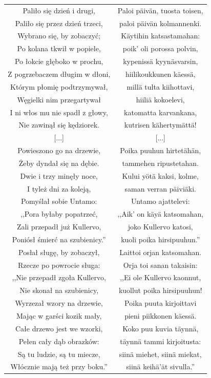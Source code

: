 \documentclass[11pt,a4paper,twoside]{report}
\begin{document}
{\begin{longtable}{c c}
Paliło się dzień i drugi, & Paloi päivän, tuosta toisen, \\
Paliło się przez dzień trzeci, & paloi päivän kolmannenki. \\
Wybrano się, by zobaczyć; & Käytihin katsastamahan: \\
Po kolana tkwił w popiele, & poik' oli porossa polvin, \\
Po łokcie głęboko w prochu, & kypenissä kyynäsvarsin, \\
Z pogrzebaczem długim w dłoni, & hiilikoukkunen käessä, \\
Którym płomię podtrzymywał, & millä tulta kiihottavi, \\
Węgielki nim przegartywał & hiiliä kokoelevi, \\
I ni włos mu nie spadł z głowy, & katomatta karvankana, \\
Nie zawinął się kędziorek. & kutrisen kähertymättä! \\
{[...]} & {[...]} \\
Powieszono go na drzewie, & Poika puuhun hirtetähän, \\
Żeby dyndał się na dębie. & tammehen ripustetahan. \\
Dwie i trzy minęły noce, & Kului yötä kaksi, kolme, \\
I tyleż dni za koleją, & saman verran päiviäki. \\
Pomyślał sobie Untamo: & Untamo ajattelevi: \\
,,Pora byłaby popatrzeć, & ,,Aik' on käyä katsomahan, \\
Zali przepadł już Kullervo, & joko Kullervo katosi, \\
Poniósł śmierć na szubienicy.'' & kuoli poika hirsipuuhun.'' \\
Posłał sługę, by zobaczył, & Laittoi orjan katsomahan. \\
Rzecze po powrocie sługa: & Orja toi sanan takaisin: \\
,,Nie przepadł zgoła Kullervo, & ,,Ei ole Kullervo kaonnut, \\
Nie skonał na szubienicy, & kuollut poika hirsipuuhun! \\
Wyrzezał wzory na drzewie, & Poika puuta kirjoittavi \\
Mając w garści kozik mały, & pieni piikkonen käessä. \\
Całe drzewo jest we wzorki, & Koko puu kuvia täynnä, \\
Pełen cały dąb obrazków: & täynnä tammi kirjoitusta: \\
Są tu ludzie, są tu miecze, & siinä miehet, siinä miekat, \\
Włócznie mają też przy boku.'' & siinä keihä'ät sivulla.'' \\
\end{longtable}
}
\end{document}
